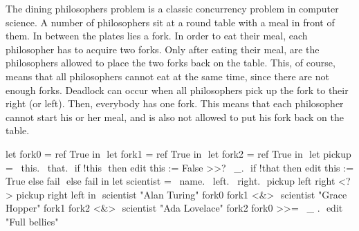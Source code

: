 The dining philosophers problem is a classic concurrency problem in computer science.
A number of philosophers sit at a round table with a meal in front of them.
In between the plates lies a fork.
In order to eat their meal, each philosopher has to acquire two forks.
Only after eating their meal, are the philosophers allowed to place the two forks back on the table.
This, of course, means that all philosophers cannot eat at the same time, since there are not enough forks.
Deadlock can occur when all philosophers pick up the fork to their right (or left).
Then, everybody has one fork.
This means that each philosopher cannot start his or her meal, and is also not allowed to put his fork back on the table.


\begin{minipage}[c]{0.6\textwidth}

\begin{TASK}[
    numbers=right,
    caption={Dining philosophers problem with three computer scientists.},
    label=lst:dining]
  let fork0 = ref True in $\label{lst:phil:fork0}$
  let fork1 = ref True in $\label{lst:phil:fork1}$
  let fork2 = ref True in $\label{lst:phil:fork2}$
  let pickup = \ this. \ that. $\label{lst:phil:this}$
    if !this $\label{lst:phil:deref}$
      then edit this := False >>? \ _. $\label{lst:phil:mark-used}$
        if !that then edit this := True else fail $\label{lst:phil:that}$
      else fail in
  let scientist = \ name. \ left. \ right. $\label{lst:phil:scientist}$
    pickup left right <?> pickup right left in $\label{lst:phil:pick}$
  scientist "Alan Turing" fork0 fork1 <&> $\label{lst:phil:scientist0}$
  scientist "Grace Hopper" fork1 fork2 <&> $\label{lst:phil:scientist1}$
  scientist "Ada Lovelace" fork2 fork0 >>= \ _ . $\label{lst:phil:scientist2}$
    edit "Full bellies"
\end{TASK}
\end{minipage}
